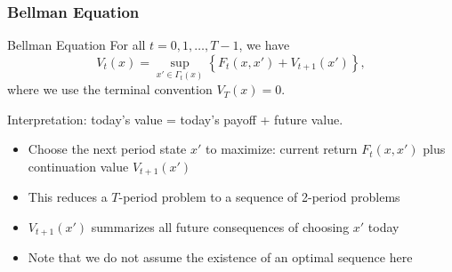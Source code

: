 \documentclass[9pt,aspectratio=169]{beamer}
\begin{document}
\begin{frame}
    \frametitle{Bellman Equation}
    \begin{block}{Bellman Equation}
        For all $t = 0, 1, \ldots, T-1$, we have
        \begin{equation*}
            V_t(x) = \sup_{x' \in \Gamma_t(x)} \left\{F_t(x, x') +
                V_{t+1}(x')\right\},
        \end{equation*}
        where we use the terminal convention $V_T(x)=0$.
    \end{block}
    Interpretation: today's value = today's payoff + future value.
    \begin{itemize}
        \item Choose the next period state $x'$ to maximize: current return
        $F_t(x, x')$ plus continuation value $V_{t+1}(x')$
        \item This reduces a $T$-period problem to a sequence of 2-period
        problems
        \item $V_{t+1}(x')$ summarizes all future consequences of choosing
        $x'$ today
        \item Note that we do not assume the existence of an optimal sequence here
    \end{itemize}
\end{frame}
\end{document}
